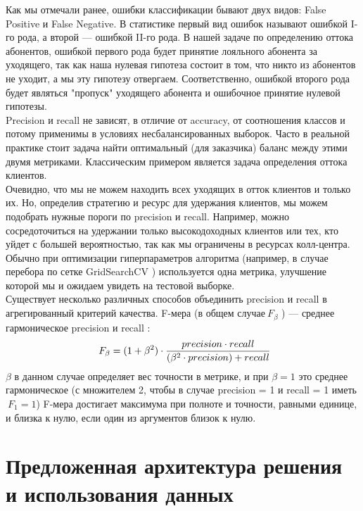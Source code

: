 \documentclass[12pt, a4paper, titlepage]{extreport}
\begin{document}
	Как мы отмечали ранее, ошибки классификации бывают двух видов: False Positive и False Negative. В статистике первый вид ошибок называют ошибкой I-го рода, а второй — ошибкой II-го рода. В нашей задаче по определению оттока абонентов, ошибкой первого рода будет принятие лояльного абонента за уходящего, так как наша нулевая гипотеза состоит в том, что никто из абонентов не уходит, а мы эту гипотезу отвергаем. Соответственно, ошибкой второго рода будет являться "пропуск" уходящего абонента и ошибочное принятие нулевой гипотезы.\\
	Precision и recall не зависят, в отличие от accuracy, от соотношения классов и потому применимы в условиях несбалансированных выборок.
	Часто в реальной практике стоит задача найти оптимальный (для заказчика) баланс между этими двумя метриками. Классическим примером является задача определения оттока клиентов.\\
	Очевидно, что мы не можем находить всех уходящих в отток клиентов и только их. Но, определив стратегию и ресурс для удержания клиентов, мы можем подобрать нужные пороги по precision и recall. Например, можно сосредоточиться на удержании только высокодоходных клиентов или тех, кто уйдет с большей вероятностью, так как мы ограничены в ресурсах колл-центра.\\
	Обычно при оптимизации гиперпараметров алгоритма (например, в случае перебора по сетке GridSearchCV ) используется одна метрика, улучшение которой мы и ожидаем увидеть на тестовой выборке.\\
	Существует несколько различных способов объединить precision и recall в агрегированный критерий качества. F-мера (в общем случае$\ F_\beta$ ) — среднее гармоническое precision и recall :
	$$
	\large \ F_\beta = (1 + \beta^2) \cdot \frac{precision \cdot recall}{(\beta^2 \cdot precision) + recall}
	$$
	$\beta$ в данном случае определяет вес точности в метрике, и при $\beta = 1$ это среднее гармоническое (с множителем 2, чтобы в случае precision = 1 и recall = 1 иметь $\ F_1 = 1$)
	F-мера достигает максимума при полноте и точности, равными единице, и близка к нулю, если один из аргументов близок к нулю.
	\section*{Предложенная архитектура решения и использования данных}
\end{document}
